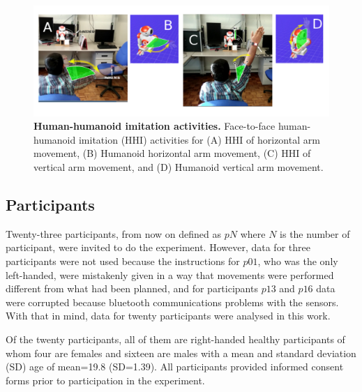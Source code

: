 \documentclass[fleqn,10pt]{wlscirep}
\begin{document}
\begin{figure}[ht]
  \centering
\includegraphics[width=1.0\textwidth]{figures/experiment/hri/pdf/hri}
    \caption{
	{\bf Human-humanoid imitation activities.} 
    		Face-to-face human-humanoid imitation (HHI) activities for 
		(A) HHI of horizontal arm movement, 
		(B) Humanoid horizontal arm movement,
		(C) HHI of vertical arm movement, and 
		(D) Humanoid vertical arm movement.
        }
    \label{fig:hri}
\end{figure}

\subsection*{Participants}
Twenty-three participants,
from now on defined as $pN$ where $N$ is the number of participant, were 
invited to do the experiment. However, data for three participants were 
not used because the instructions for $p01$, who was the only left-handed,
were mistakenly given in a way that movements were performed different
from what had been planned, and for participants $p13$ and $p16$ 
data were corrupted because bluetooth communications problems with the 
sensors. With that in mind, data for twenty participants were analysed in 
this work.

Of the twenty participants, all of them are right-handed healthy participants 
of whom four are females and sixteen are males with a mean and standard 
deviation (SD) age of mean=19.8 (SD=1.39). All participants provided 
informed consent forms prior to participation in the experiment.
\end{document}
